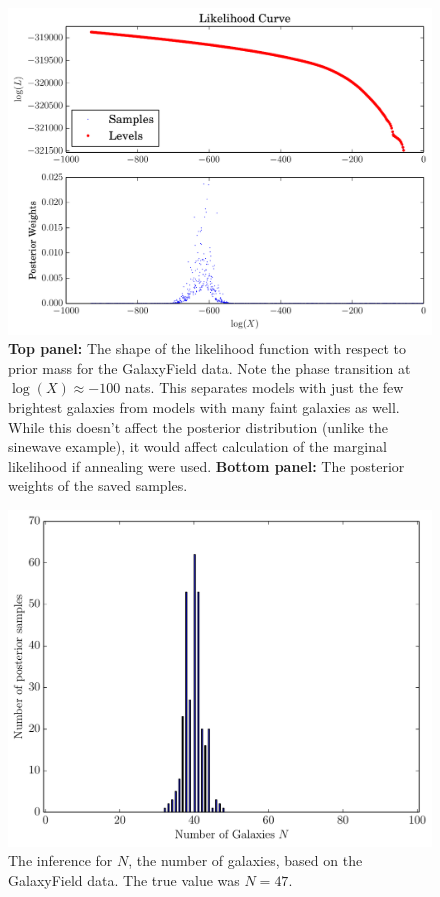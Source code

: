 \documentclass[letterpaper, 11pt]{article}
\begin{document}
\begin{figure}
\begin{center}
\includegraphics[scale=0.5]{galaxyfield_likelihood.pdf}
\caption{{\bf Top panel: }
The shape of the likelihood function with respect to prior mass for the
GalaxyField data. Note the phase
transition at $\log(X) \approx -100$ nats. This separates models with just
the few brightest galaxies from models with many faint galaxies as well.
While this doesn't affect the
posterior distribution (unlike the sinewave example), it would affect calculation
of the marginal likelihood if annealing were used.
{\bf Bottom panel: }The posterior weights of the saved samples.
\label{fig:galaxyfield_likelihood}}
\end{center}
\end{figure}

\begin{figure}
\begin{center}
\includegraphics[scale=0.5]{N_galaxy_result.pdf}
\caption{The inference for $N$, the number of galaxies, based on the
GalaxyField data. The true value was $N=47$.
\label{fig:N_galaxy_result}}
\end{center}
\end{figure}
\end{document}
